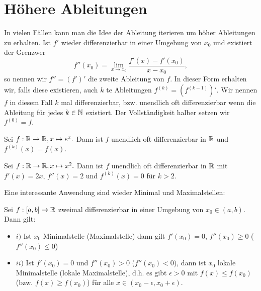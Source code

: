 \section{Höhere Ableitungen}
\label{\detokenize{differential/hoehereOrdnung:hohere-ableitungen}}\label{\detokenize{differential/hoehereOrdnung::doc}}
In vielen Fällen kann man die Idee der Ableitung iterieren um höher Ableitungen zu erhalten. Ist \(f'\) wieder differenzierbar in einer Umgebung von \(x_0\) und existiert der Grenzwer
\begin{equation*}
 f''(x_0) = \lim_{x \rightarrow x_0} \frac{f'(x) - f'(x_0)}{x-x_0} ,
\end{equation*}
so nennen wir \(f'' = (f')'\) die zweite Ableitung von \(f\). In dieser Form erhalten wir, falls diese existieren, auch \(k\) te Ableitungen \(f^{(k)}=(f^{(k-1)})'\). Wir nennen \(f\) in diesem Fall \(k\) mal differenzierbar, bzw. unendlich oft differenzierbar wenn die Ableitung für jedes \(k \in \mathbb{N}\) existiert. Der Vollständigkeit halber setzen wir \(f^{(0)} = f\).
\label{differential/hoehereOrdnung:example-0}
\begin{example}{}{}



Sei \(f: \mathbb{R} \rightarrow \mathbb{R}, x \mapsto e^x.\) Dann ist \(f\) unendlich oft differenzierbar in \(\mathbb{R}\) und \(f^{(k)}(x)=f(x)\).
\end{example}
\label{differential/hoehereOrdnung:example-1}
\begin{example}{}{}



Sei \(f: \mathbb{R} \rightarrow \mathbb{R}, x \mapsto x^2.\) Dann ist \(f\) unendlich oft differenzierbar in \(\mathbb{R}\) mit \(f'(x)=2x\), \(f''(x)=2\) und \(f^{(k)}(x)=0\) für \(k > 2\).
\end{example}

Eine interessante Anwendung sind wieder Minimal  und Maximalstellen:
\label{differential/hoehereOrdnung:theorem-2}
\begin{theorem}{}{}



Sei \(f:[a,b]\rightarrow \mathbb{R}\) zweimal differenzierbar in einer Umgebung von \(x_0 \in (a,b)\). Dann gilt:
\begin{itemize}
\item {} 
\(i)\) Ist \(x_0\) Minimalstelle (Maximalstelle) dann gilt \(f'(x_0) = 0\), \(f''(x_0) \geq 0\) (\(f''(x_0) \leq 0\))

\item {} 
\(ii)\) Ist \(f'(x_0) = 0\) und \(f''(x_0) > 0\) (\(f''(x_0) < 0\)), dann ist \(x_0\) lokale Minimalstelle (lokale Maximalstelle), d.h. es gibt \(\epsilon > 0\) mit \(f(x) \leq f(x_0)\) (bzw. \(f(x) \geq f(x_0)\)) für alle \(x\in (x_0-\epsilon, x_0+\epsilon)\).

\end{itemize}
\end{theorem}

